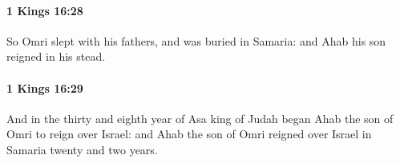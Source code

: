 		\paragraph{1 Kings 16:28} %
			\label{1KINGS-16-28}

			So Omri slept with his fathers, and was buried in Samaria: and Ahab his son reigned in his stead.


		\paragraph{1 Kings 16:29} %
			\label{1KINGS-16-29}

			And in the thirty and eighth year of Asa king of Judah began Ahab the son of Omri to reign over Israel: and Ahab the son of Omri reigned over Israel in Samaria twenty and two years.


